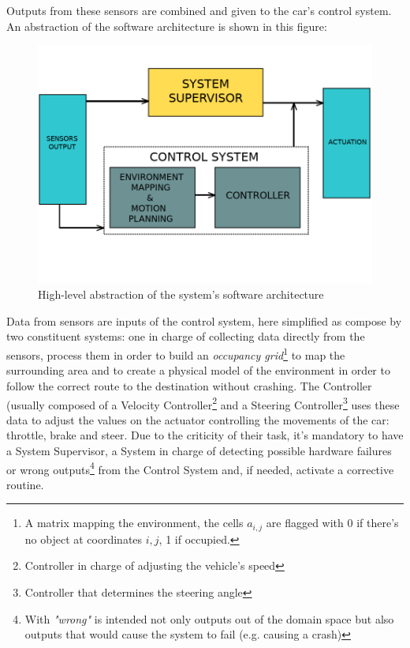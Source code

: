 Outputs from these sensors are combined and given to the car's control system.
An abstraction of the software architecture is shown in this figure:\newline\newline

\begin{figure}[h!]
	\includegraphics[width=\textwidth]{img/av-architecture.png}
	\caption{High-level abstraction of the system's software architecture}
\end{figure}

Data from sensors are inputs of the control system, here simplified as compose by two constituent systems: one in charge of collecting data directly from the sensors, process them in order to build an \textsl{occupancy grid}\footnote{A matrix mapping the environment, the cells $a_{i,j}$ are flagged with 0 if there's no object at coordinates $i,j$, 1 if occupied.} to map the surrounding area and to create a physical model of the environment in order to follow the correct route to the destination without crashing. The Controller (usually composed of a Velocity Controller\footnote{Controller in charge of adjusting the vehicle's speed} and a Steering Controller\footnote{Controller that determines the steering angle} uses these data to adjust the values on the actuator controlling the movements of the car: throttle, brake and steer.\newline
Due to the criticity of their task, it's mandatory to have a System Supervisor, a System in charge of detecting possible hardware failures or wrong outputs\footnote{With \textsl{"wrong"} is intended not only outputs out of the domain space but also outputs that would cause the system to fail (e.g. causing a crash)} from the Control System and, if needed, activate a corrective routine.

